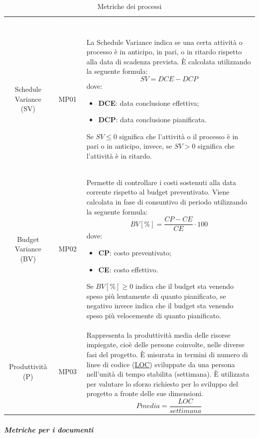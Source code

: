 \begin{table}[H]
\caption{Metriche dei processi}
	\begin{center}
	\begin{tabular}{ c c L{9.5cm} }
		\textcolor{white}{\textbf{Nome}} & \textcolor{white}{\textbf{Codice}}& \centerline{\textcolor{white}{\textbf{Descrizione}}} \\
		Schedule Variance (SV)  & MP01 & La Schedule Variance indica se una certa attività o processo è in anticipo, in pari, o in ritardo rispetto alla data di scadenza prevista. È calcolata utilizzando la seguente formula: \newline
\[ SV = DCE-DCP\]
dove: \begin{itemize}
\item \textbf{DCE}: data conclusione effettiva;
\item \textbf{DCP}: data conclusione pianificata.
\end{itemize}
Se $SV \leq 0$ significa che l'attività o il processo è in pari o in anticipo, invece, se $SV > 0$ significa che l'attività è in ritardo. \\	
		Budget Variance (BV) & MP02 & Permette di controllare i costi sostenuti alla data corrente rispetto al budget preventivato. Viene calcolata in fase di consuntivo di periodo utilizzando la seguente formula: \newline
		\[ BV[\%] = \frac{CP-CE}{CE}\cdot 100 \]		
dove: \begin{itemize}
\item \textbf{CP}: costo preventivato;
\item \textbf{CE}: costo effettivo.
\end{itemize}
Se $BV[\%] \geq 0$ indica che il budget sta venendo speso più lentamente di quanto pianificato, se negativo invece indica che il budget sta venendo speso più velocemente di quanto pianificato. \\
Produttività (P) & MP03 & Rappresenta la produttività media delle risorse impiegate, cioè delle persone coinvolte, nelle diverse fasi del progetto. È misurata in termini di numero di linee di codice (\hyperref[par:MS01]{LOC}) sviluppate da una persona nell’unità di tempo stabilita (settimana). È utilizzata per valutare lo sforzo richiesto per lo sviluppo  del progetto a fronte delle sue dimensioni. 
\[ Pmedia = \frac{LOC}{settimana}\]
	\end{tabular}
	\end{center}
	\end{table}
\pagebreak
\subparagraph{Metriche per i documenti}\mbox{} \\ 
